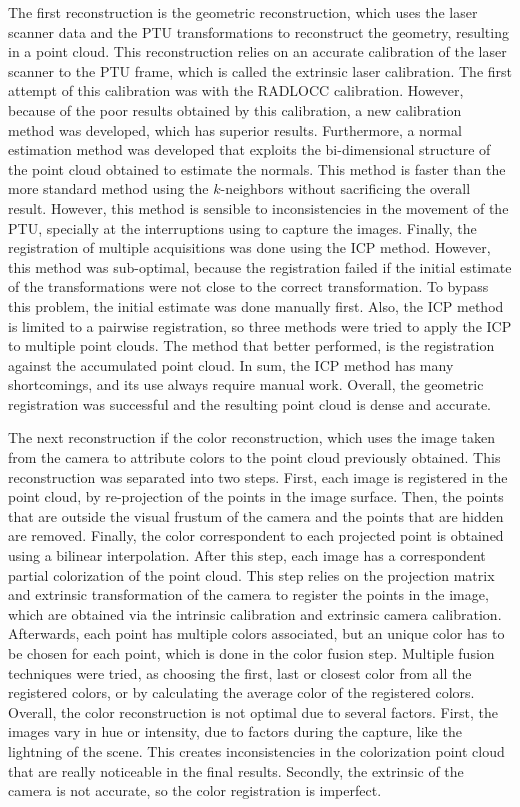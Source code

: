 The first reconstruction is the geometric reconstruction, which uses the laser scanner data and the PTU transformations to reconstruct the geometry, resulting in a point cloud. This reconstruction relies on an accurate calibration of the laser scanner to the PTU frame, which is called the extrinsic laser calibration. The first attempt of this calibration was with the RADLOCC calibration. However, because of the poor results obtained by this calibration, a new calibration method was developed, which has superior results. Furthermore, a normal estimation method was developed that exploits the bi-dimensional structure of the point cloud obtained to estimate the normals. This method is faster than the more standard method using the $k$-neighbors without sacrificing the overall result. However, this method is sensible to inconsistencies in the movement of the PTU, specially at the interruptions using to capture the images. Finally, the registration of multiple acquisitions was done using the ICP method. However, this method was sub-optimal, because the registration failed if the initial estimate of the transformations were not close to the correct transformation. To bypass this problem, the initial estimate was done manually first. Also, the ICP method is limited to a pairwise registration, so three methods were tried to apply the ICP to multiple point clouds. The method that better performed, is the registration against the accumulated point cloud. In sum, the ICP method has many shortcomings, and its use always require manual work. Overall, the geometric registration was successful and the resulting point cloud is dense and accurate. 

The next reconstruction if the color reconstruction, which uses the image taken from the camera to attribute colors to the point cloud previously obtained. This reconstruction was separated into two steps. First, each image is registered in the point cloud, by re-projection of the points in the image surface. Then, the points that are outside the visual frustum of the camera and the points that are hidden are removed. Finally, the color correspondent to each projected point is obtained using a bilinear interpolation. After this step, each image has a correspondent partial colorization of the point cloud. This step relies on the projection matrix and extrinsic transformation of the camera to register the points in the image, which are obtained via the intrinsic calibration and extrinsic camera calibration. Afterwards, each point has multiple colors associated, but an unique color has to be chosen for each point, which is done in the color fusion step. Multiple fusion techniques were tried, as choosing the first, last or closest color from all the registered colors, or by calculating the average color of the registered colors. Overall, the color reconstruction is not optimal due to several factors. First, the images vary in hue or intensity, due to factors during the capture, like the lightning of the scene. This creates inconsistencies in the colorization point cloud that are really noticeable in the final results. Secondly, the extrinsic of the camera is not accurate, so the color registration is imperfect. 

